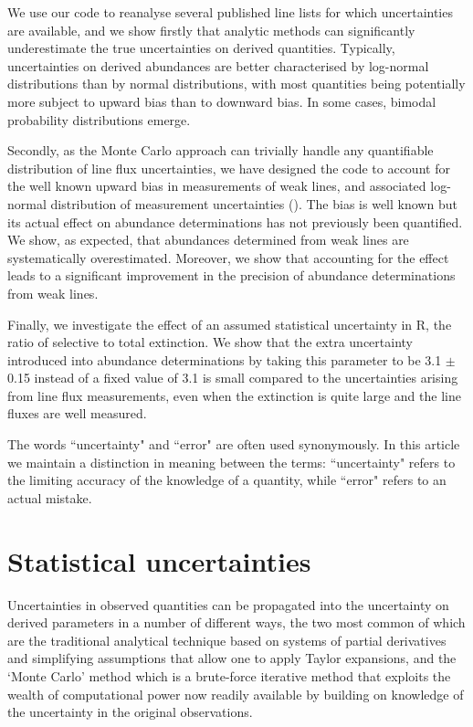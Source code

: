 \documentclass[useAMS,usenatbib]{mn2e}
\begin{document}
We use our code to reanalyse several published line lists for which uncertainties are available, and we show firstly that analytic methods can significantly underestimate the true uncertainties on derived quantities.  Typically, uncertainties on derived abundances are better characterised by log-normal distributions than by normal distributions, with most quantities being potentially more subject to upward bias than to downward bias.  In some cases, bimodal probability distributions emerge.

Secondly, as the Monte Carlo approach can trivially handle any quantifiable distribution of line flux uncertainties, we have designed the code to account for the well known upward bias in measurements of weak lines, and associated log-normal distribution of measurement uncertainties (\citet{1994A&A...287..676R}).  The bias is well known but its actual effect on abundance determinations has not previously been quantified.  We show, as expected, that abundances determined from weak lines are systematically overestimated.  Moreover, we show that accounting for the effect leads to a significant improvement in the precision of abundance determinations from weak lines.

Finally, we investigate the effect of an assumed statistical uncertainty in R, the ratio of selective to total extinction.  We show that the extra uncertainty introduced into abundance determinations by taking this parameter to be 3.1 $\pm$ 0.15 instead of a fixed value of 3.1 is small compared to the uncertainties arising from line flux measurements, even when the extinction is quite large and the line fluxes are well measured.

The words ``uncertainty" and ``error" are often used synonymously.  In this article we maintain a distinction in meaning between the terms: ``uncertainty" refers to the limiting accuracy of the knowledge of a quantity, while ``error" refers to an actual mistake.

\section{Statistical uncertainties}

Uncertainties in observed quantities can be propagated into the uncertainty on derived parameters in a number of different ways, the two most common of which are the traditional analytical technique based on systems of partial derivatives and simplifying assumptions that allow one to apply Taylor expansions, and the `Monte Carlo' method which is a brute-force iterative method that exploits the wealth of computational power now readily available by building on knowledge of the uncertainty in the original observations.
\end{document}
